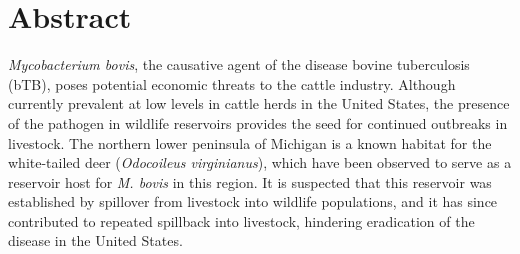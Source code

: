 \documentclass[number,preprint,review,12pt]{elsarticle}
\begin{document}
\begin{frontmatter}
        


\end{frontmatter}

\pagebreak

\section{Abstract}
\doublespacing
\textit{Mycobacterium bovis}, the causative agent of the disease bovine tuberculosis (bTB), poses potential economic threats to the cattle industry.  Although currently prevalent at low levels in cattle herds in the United States, the presence of the pathogen in wildlife reservoirs provides the seed for continued outbreaks in livestock. The northern lower peninsula of Michigan is a known habitat for the white-tailed deer (\textit{Odocoileus virginianus}), which have been observed to serve as a reservoir host for \textit{M. bovis} in this region. It is suspected that this reservoir was established by spillover from livestock into wildlife populations, and it has since contributed to repeated spillback into livestock, hindering eradication of the disease in the United States. 
\end{document}
